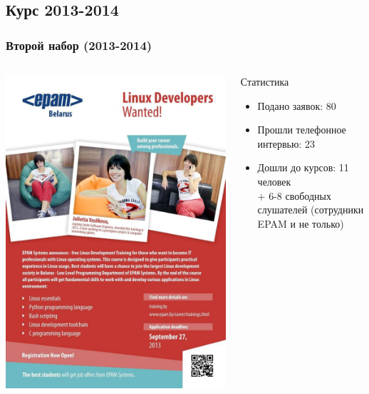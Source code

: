 \subsection[2013]{Курс 2013-2014}
\begin{frame}
\frametitle{Второй набор (2013-2014)}

  \begin{columns}


	\includegraphics[width=\textwidth]{linux_courses_epam}

	  \begin{block}{Статистика}
		\begin{itemize}
		  \item Подано заявок: 80
		  \item Прошли телефонное интервью: 23
		  \item Дошли до курсов: 11 человек \\ + 6-8 свободных слушателей (сотрудники EPAM и не только)
		\end{itemize}
	  \end{block}
  \end{columns}
\end{frame}

